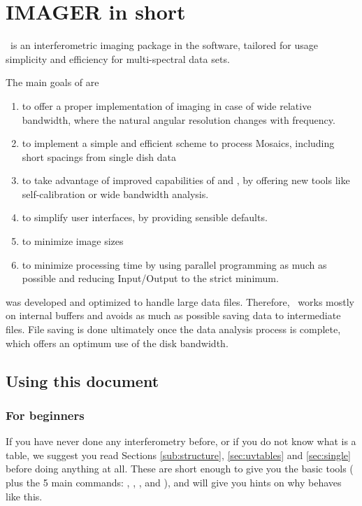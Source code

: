 \section{IMAGER in short}

\imager\ is an interferometric imaging package in the \gildas{} 
software, tailored for usage simplicity and efficiency for 
multi-spectral data sets.

The main goals of \imager{} are
\begin{enumerate}
\item to offer a proper implementation of imaging in case of
wide relative bandwidth, where the natural angular resolution
changes with frequency.
\item to implement a simple and efficient scheme to process Mosaics,
including short spacings from single dish data
\item to take advantage of improved capabilities of \NOEMA{} and 
\ALMA{}, by offering new tools like self-calibration or wide bandwidth 
analysis.
\item to simplify user interfaces, by providing sensible defaults.
\item to minimize image sizes 
\item to minimize processing time by using parallel programming as much 
as possible and reducing Input/Output to the strict minimum.
\end{enumerate}

\imager{} was developed and optimized to handle large data files. 
Therefore, \imager{}\  works mostly on internal buffers and avoids as 
much as possible saving data to intermediate files. File saving is done 
ultimately once the data analysis process is complete, which offers an 
optimum use of the disk bandwidth.

\subsection{Using this document}

\subsubsection{For beginners}
If you have never done any interferometry before, or if you do not know 
what is a \uv{} table, we suggest you read Sections \ref{sub:structure},
\ref{sec:uvtables} 
and \ref{sec:single} before doing anything at all. These are short 
enough to give you the basic tools ( plus the 5 main 
commands: , , ,  and 
), and will give you hints on why \imager{} behaves like 
this.

